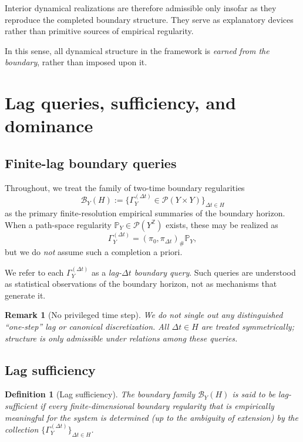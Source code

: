 \documentclass[11pt]{article}
\newtheorem{definition}{Definition}
\newtheorem{remark}{Remark}
\begin{document}
Interior dynamical realizations are therefore admissible only insofar as they
reproduce the completed boundary structure.  They serve as explanatory
devices rather than primitive sources of empirical regularity.

\medskip

In this sense, all dynamical structure in the framework is \emph{earned from the boundary}, rather
than imposed upon it.


\section{Lag queries, sufficiency, and dominance}

\subsection{Finite-lag boundary queries}

Throughout, we treat the family of two-time boundary regularities
\[
\mathcal B_Y(H)
:= \bigl\{\Gamma_Y^{(\Delta t)} \in \mathcal P(Y\times Y)\bigr\}_{\Delta t\in H}
\]
as the primary finite-resolution empirical summaries of the boundary horizon.
When a path-space regularity $\mathbb P_Y\in\mathcal P(Y^{\mathbb Z})$ exists,
these may be realized as
\[
\Gamma_Y^{(\Delta t)} = (\pi_0,\pi_{\Delta t})_\#\mathbb P_Y,
\]
but we do \emph{not} assume such a completion a priori.

We refer to each $\Gamma_Y^{(\Delta t)}$ as a \emph{lag-$\Delta t$ boundary query}.
Such queries are understood as statistical observations of the boundary horizon,
not as mechanisms that generate it.

\begin{remark}[No privileged time step]
We do not single out any distinguished ``one-step'' lag or canonical discretization.
All $\Delta t\in H$ are treated symmetrically; structure is only admissible under relations
among these queries.
\end{remark}

\subsection{Lag sufficiency}

\begin{definition}[Lag sufficiency]\label{def:lag-sufficiency}
The boundary family $\mathcal B_Y(H)$ is said to be \emph{lag-sufficient} if every
finite-dimensional boundary regularity that is empirically meaningful for the system
is determined (up to the ambiguity of extension) by the collection
$\{\Gamma_Y^{(\Delta t)}\}_{\Delta t\in H}$.
\end{definition}
\end{document}
